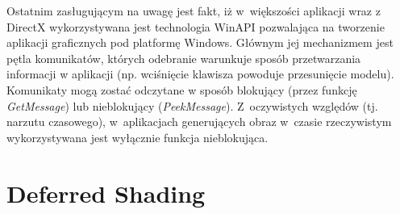 Ostatnim zasługującym na uwagę jest fakt, iż w~większości aplikacji wraz z DirectX wykorzystywana jest technologia WinAPI pozwalająca na tworzenie aplikacji graficznych pod platformę Windows. Głównym jej mechanizmem jest pętla komunikatów, których odebranie warunkuje sposób przetwarzania informacji w aplikacji (np. wciśnięcie klawisza powoduje przesunięcie modelu). Komunikaty mogą zostać odczytane w sposób blokujący (przez funkcję \emph{GetMessage}) lub nieblokujący (\emph{PeekMessage}). Z~oczywistych względów (tj. narzutu czasowego), w~aplikacjach generujących obraz w~czasie rzeczywistym wykorzystywana jest wyłącznie funkcja nieblokująca.

\section{Deferred Shading}

